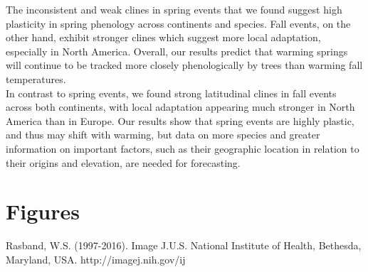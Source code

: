 \documentclass{article}
\begin{document}
The inconsistent and weak clines in spring events that we found suggest high plasticity in spring phenology across continents and species. Fall events, on the other hand, exhibit stronger clines which suggest more local adaptation, especially in North America. Overall, our results predict that warming springs will continue to be tracked more closely phenologically by trees than warming fall temperatures.
\\

In contrast to spring events, we found strong latitudinal clines in fall events across both continents, with local adaptation appearing much stronger in North America than in Europe. Our results show that spring events are highly plastic, and thus may shift with warming, but data on more species and greater information on important factors, such as their geographic location in relation to their origins and elevation, are needed for forecasting. 






\citet{Keir11}



\section{Figures}


Rasband, W.S. (1997-2016). Image J.U.S. National Institute of Health, Bethesda, Maryland, USA.
http://imagej.nih.gov/ij


\end{document}
